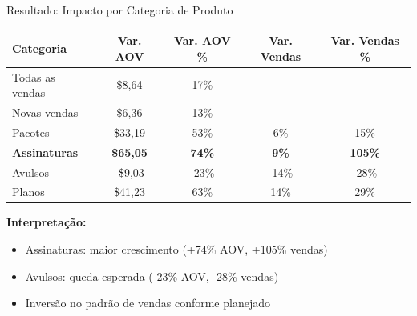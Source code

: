 \documentclass{beamer}
\begin{document}
    \begin{frame}{Resultado: Impacto por Categoria de Produto}
        \begin{table}[htb]
        \centering
        \small
        \begin{tabular}{lcccc}
        \hline
        \textbf{Categoria} & \textbf{Var. AOV} & \textbf{Var. AOV \%} & \textbf{Var. Vendas} & \textbf{Var. Vendas \%} \\
        \hline
        Todas as vendas & \$8,64 & 17\% & -- & -- \\
        Novas vendas & \$6,36 & 13\% & -- & -- \\
        Pacotes & \$33,19 & 53\% & 6\% & 15\% \\
        \textbf{Assinaturas} & \textbf{\$65,05} & \textbf{74\%} & \textbf{9\%} & \textbf{105\%} \\
        Avulsos & -\$9,03 & -23\% & -14\% & -28\% \\
        Planos & \$41,23 & 63\% & 14\% & 29\% \\
        \hline
        \end{tabular}
        \end{table}

        \vspace{0.3cm}

        \textbf{Interpretação:}
        \begin{itemize}
            \item Assinaturas: maior crescimento (+74\% AOV, +105\% vendas)
            \item Avulsos: queda esperada (-23\% AOV, -28\% vendas)
            \item Inversão no padrão de vendas conforme planejado
        \end{itemize}
    \end{frame}

\end{document}
